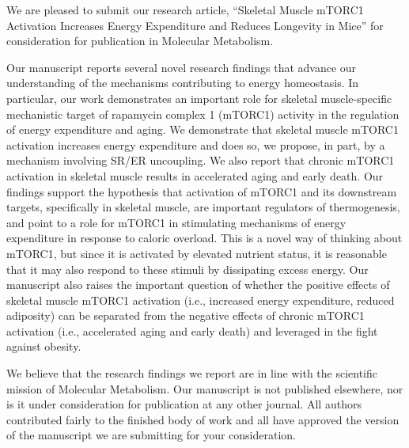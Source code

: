 \documentclass[a4paper,10pt]{letter}
\begin{document}
\begin{letter}{}

\opening{} %

We are pleased to submit our research article, “Skeletal Muscle mTORC1 Activation Increases Energy Expenditure and Reduces Longevity in Mice” for consideration for publication in Molecular Metabolism. 

Our manuscript reports several novel research findings that advance our understanding of the mechanisms contributing to energy homeostasis. In particular, our work demonstrates an important role for skeletal muscle-specific mechanistic target of rapamycin complex 1 (mTORC1) activity in the regulation of energy expenditure and aging.   We demonstrate that skeletal muscle mTORC1 activation increases energy expenditure and does so, we propose, in part, by a mechanism involving SR/ER uncoupling. We also report that chronic mTORC1 activation in skeletal muscle results in accelerated aging and early death.  Our findings support the hypothesis that activation of mTORC1 and its downstream targets, specifically in skeletal muscle, are important regulators of thermogenesis, and point to a role for mTORC1 in stimulating mechanisms of energy expenditure in response to caloric overload. This is a novel way of thinking about mTORC1, but since it is activated by elevated nutrient status, it is reasonable that it may also respond to these stimuli by dissipating excess energy.  Our manuscript also raises the important question of whether the positive effects of skeletal muscle mTORC1 activation (i.e., increased energy expenditure, reduced adiposity) can be separated from the negative effects of chronic mTORC1 activation (i.e., accelerated aging and early death) and leveraged in the fight against obesity.

We believe that the research findings we report are in line with the scientific mission of Molecular Metabolism. Our manuscript is not published elsewhere, nor is it under consideration for publication at any other journal. All authors contributed fairly to the finished body of work and all have approved the version of the manuscript we are submitting for your consideration. 









\end{letter}
\end{document}
